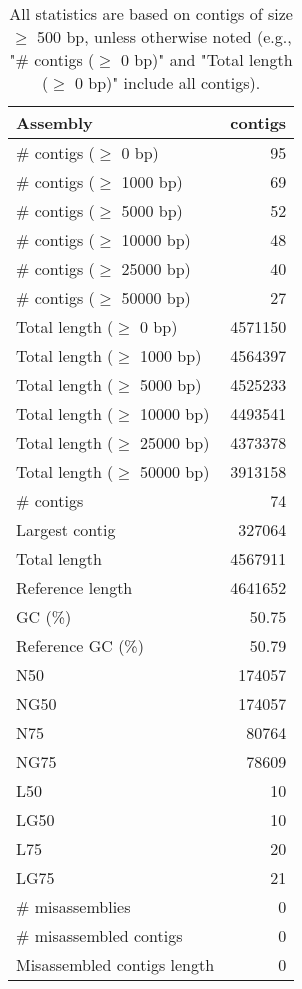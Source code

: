 \documentclass[12pt,a4paper]{article}
\begin{document}
\begin{table}[ht]
\begin{center}
\caption{All statistics are based on contigs of size $\geq$ 500 bp, unless otherwise noted (e.g., "\# contigs ($\geq$ 0 bp)" and "Total length ($\geq$ 0 bp)" include all contigs).}
\begin{tabular}{|l*{1}{|r}|}
\hline
Assembly & contigs \\ \hline
\# contigs ($\geq$ 0 bp) & 95 \\ \hline
\# contigs ($\geq$ 1000 bp) & 69 \\ \hline
\# contigs ($\geq$ 5000 bp) & 52 \\ \hline
\# contigs ($\geq$ 10000 bp) & 48 \\ \hline
\# contigs ($\geq$ 25000 bp) & 40 \\ \hline
\# contigs ($\geq$ 50000 bp) & 27 \\ \hline
Total length ($\geq$ 0 bp) & 4571150 \\ \hline
Total length ($\geq$ 1000 bp) & 4564397 \\ \hline
Total length ($\geq$ 5000 bp) & 4525233 \\ \hline
Total length ($\geq$ 10000 bp) & 4493541 \\ \hline
Total length ($\geq$ 25000 bp) & 4373378 \\ \hline
Total length ($\geq$ 50000 bp) & 3913158 \\ \hline
\# contigs & 74 \\ \hline
Largest contig & 327064 \\ \hline
Total length & 4567911 \\ \hline
Reference length & 4641652 \\ \hline
GC (\%) & 50.75 \\ \hline
Reference GC (\%) & 50.79 \\ \hline
N50 & 174057 \\ \hline
NG50 & 174057 \\ \hline
N75 & 80764 \\ \hline
NG75 & 78609 \\ \hline
L50 & 10 \\ \hline
LG50 & 10 \\ \hline
L75 & 20 \\ \hline
LG75 & 21 \\ \hline
\# misassemblies & 0 \\ \hline
\# misassembled contigs & 0 \\ \hline
Misassembled contigs length & 0 \\ \hline

\end{tabular}
\end{center}
\end{table}
\end{document}

